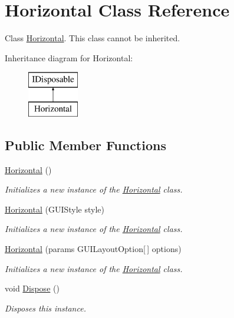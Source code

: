 \hypertarget{class_horizontal}{}\section{Horizontal Class Reference}
\label{class_horizontal}


Class \hyperlink{class_horizontal}{Horizontal}. This class cannot be inherited.  


Inheritance diagram for Horizontal\+:\begin{figure}[H]
\begin{center}
\leavevmode
\includegraphics[height=2.000000cm]{class_horizontal}
\end{center}
\end{figure}
\subsection*{Public Member Functions}
\begin{DoxyCompactItemize}
\item 
\hyperlink{class_horizontal_ac5c90c94a8392d9c130e8d0bcb3b32fc}{Horizontal} ()
\begin{DoxyCompactList}\small\item\em Initializes a new instance of the \hyperlink{class_horizontal}{Horizontal} class. \end{DoxyCompactList}\item 
\hyperlink{class_horizontal_a70640fe78e5264944ad7359f6eb9f0d2}{Horizontal} (G\+U\+I\+Style style)
\begin{DoxyCompactList}\small\item\em Initializes a new instance of the \hyperlink{class_horizontal}{Horizontal} class. \end{DoxyCompactList}\item 
\hyperlink{class_horizontal_a6a9031bf0678fd40e1f1ea831c6cad0c}{Horizontal} (params G\+U\+I\+Layout\+Option\mbox{[}$\,$\mbox{]} options)
\begin{DoxyCompactList}\small\item\em Initializes a new instance of the \hyperlink{class_horizontal}{Horizontal} class. \end{DoxyCompactList}\item 
void \hyperlink{class_horizontal_a04962fe36ec16ab09988b50828c9fe16}{Dispose} ()
\begin{DoxyCompactList}\small\item\em Disposes this instance. \end{DoxyCompactList}\end{DoxyCompactItemize}


